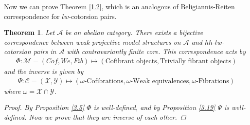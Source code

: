 \documentclass[12pt]{amsart}
\numberwithin{equation}{section}
\newtheorem{theorem}[lemma]{Theorem}
\theoremstyle{definition}
\newtheorem*{theorem 0*}{Theorem}
\newtheorem*{theorem a*}{Theorem A}
\newtheorem*{theorem b*}{Theorem B}
\numberwithin{diagram}{section}
\begin{document}
Now we can prove Theorem \ref{1.2}, which is an analogous of Beligiannis-Reiten correspondence for $lw$-cotorsion pairs.

\begin{theorem}\label{3.20}
Let $\mathcal{A}$ be an abelian category. There exists a bijective correspondence between weak projective model structures on $\mathcal{A}$ and $hh$-$lw$-cotorsion pairs in $\mathcal{A}$ with contravariantly finite core. This correspondence acts by
\begin{align*}
\Phi:\mathcal{M}=(Cof,We,Fib)\longmapsto (\text{Cofibrant objects},\text{Trivially fibrant objects})
\end{align*}
and the inverse is given by
\begin{align*}
\Psi:\mathcal{C}=(\mathcal{X},\mathcal{Y})\longmapsto (\omega\text{-Cofibrations},\omega\text{-Weak equivalences}, \omega\text{-Fibrations})
\end{align*}
where $\omega=\mathcal{X}\cap\mathcal{Y}$.
\begin{proof}
By Proposition \ref{3.5} $\Phi$ is well-defined, and by Proposition \ref{3.19} $\Psi$ is well-defined.
Now we prove that they are inverse of each other.


\end{proof}
\end{theorem}
\end{document}
